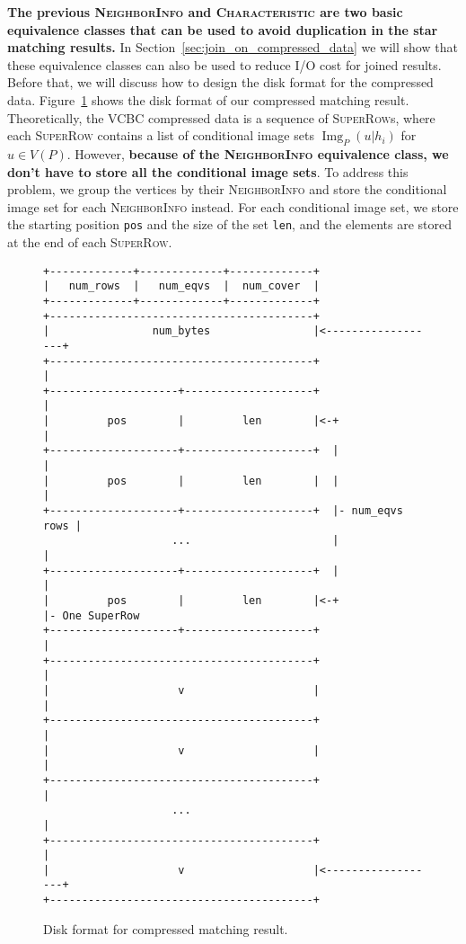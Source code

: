 \textbf{The previous \textsc{NeighborInfo} and \textsc{Characteristic}
are two basic equivalence classes that can be used to avoid duplication in the star matching results.}
In Section~\ref{sec:join_on_compressed_data} we will show that these equivalence classes can also be used to reduce I/O cost for joined results.
Before that, we will discuss how to design the disk format for the compressed data.
Figure~\ref{img:result_disk_format} shows the disk format of our compressed matching result.
Theoretically, the VCBC compressed data is a sequence of \textsc{SuperRow}s,
where each \textsc{SuperRow} contains a list of conditional image sets $\operatorname{Img}_P(u | h_i)$ for $u \in V(P)$.
However, \textbf{because of the \textsc{NeighborInfo} equivalence class, we don't have to store all the conditional image sets}.
To address this problem, we group the vertices by their \textsc{NeighborInfo} and store the conditional image set for each \textsc{NeighborInfo} instead.
For each conditional image set, we store the starting position \texttt{pos} and the size of the set \texttt{len}, and the elements are stored at the end of each \textsc{SuperRow}.
\begin{figure}[ht]
  \centering
  \begin{verbatim}
+-------------+-------------+-------------+
|   num_rows  |   num_eqvs  |  num_cover  |
+-------------+-------------+-------------+
+-----------------------------------------+
|                num_bytes                |<------------------+
+-----------------------------------------+                   |
+--------------------+--------------------+                   |
|         pos        |         len        |<-+                |
+--------------------+--------------------+  |                |
|         pos        |         len        |  |                |
+--------------------+--------------------+  |- num_eqvs rows |
                    ...                      |                |
+--------------------+--------------------+  |                |
|         pos        |         len        |<-+                |- One SuperRow
+--------------------+--------------------+                   |
+-----------------------------------------+                   |
|                    v                    |                   |
+-----------------------------------------+                   |
|                    v                    |                   |
+-----------------------------------------+                   |
                    ...                                       |
+-----------------------------------------+                   |
|                    v                    |<------------------+
+-----------------------------------------+
  \end{verbatim}
  \caption{Disk format for compressed matching result.}\label{img:result_disk_format}
\end{figure}
